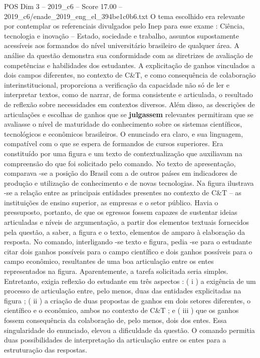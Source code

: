 \begin{textsample}{POS Dim 3 – 2019\_c6 – Score 17.00 – 2019\_c6/enade\_2019\_eng\_el\_394be1c0b6.txt}
O tema escolhido era relevante por contemplar os referenciais divulgados pelo Inep para esse exame : Ciência, tecnologia e inovação – Estado, sociedade e trabalho, assuntos supostamente acessíveis aos formandos do nível universitário brasileiro de qualquer área.
A análise da questão demonstra sua conformidade com as diretrizes de avaliação de competências e habilidades dos estudantes.
A explicitação de ganhos vinculados a dois campos diferentes, no contexto de C\&T, e como consequência de colaboração interinstitucional, proporciona a verificação da capacidade não só de ler e interpretar textos, como de narrar, de forma consistente e articulada, o resultado de reflexão sobre necessidades em contextos diversos.
Além disso, as descrições de articulações e escolhas de ganhos que se \textbf{julgassem} relevantes permitiram que se avaliasse o nível de maturidade do conhecimento sobre os sistemas científicos, tecnológicos e econômicos brasileiros.
O enunciado era claro, e sua linguagem, compatível com o que se espera de formandos de cursos superiores.
Era constituído por uma figura e um texto de contextualização que auxiliavam na compreensão do que foi solicitado pelo comando.
No texto de apresentação, comparava -se a posição do Brasil com a de outros países em indicadores de produção e utilização de conhecimento e de novas tecnologias.
Na figura ilustrava -se a relação entre as principais entidades presentes no contexto de C\&T – as instituições de ensino superior, as empresas e o setor público.
Havia o pressuposto, portanto, de que os egressos fossem capazes de sustentar ideias articuladas e níveis de argumentação, a partir dos elementos textuais fornecidos pela questão, a saber, a figura e o texto, elementos de amparo à elaboração da resposta.
No comando, interligando -se texto e figura, pedia -se para o estudante citar dois ganhos possíveis para o campo científico e dois ganhos possíveis para o campo econômico, resultantes de uma boa articulação entre os entes representados na figura.
Aparentemente, a tarefa solicitada seria simples.
Entretanto, exigia reflexão do estudante em três aspectos : ( i ) a exigência de um processo de articulação entre, pelo menos, duas das entidades explicitadas na figura ; ( ii ) a criação de duas propostas de ganhos em dois setores diferentes, o científico e o econômico, ambos no contexto de C\&T ; e ( iii ) que os ganhos fossem consequência da colaboração de, pelo menos, dois dos entes.
Essa singularidade do enunciado, elevou a dificuldade da questão.
O comando permitia duas possibilidades de interpretação da articulação entre os entes para a estruturação das respostas.

\end{textsample}
